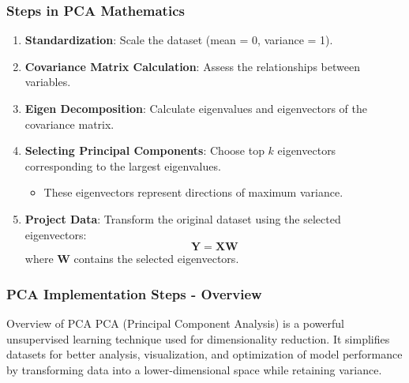 \documentclass[aspectratio=169]{beamer}
\begin{document}
\begin{frame}[fragile]
    \frametitle{Steps in PCA Mathematics}
    \begin{enumerate}
        \item \textbf{Standardization}: Scale the dataset (mean = 0, variance = 1).
        \item \textbf{Covariance Matrix Calculation}: Assess the relationships between variables.
        \item \textbf{Eigen Decomposition}: Calculate eigenvalues and eigenvectors of the covariance matrix.
        \item \textbf{Selecting Principal Components}: Choose top \( k \) eigenvectors corresponding to the largest eigenvalues.
            \begin{itemize}
                \item These eigenvectors represent directions of maximum variance.
            \end{itemize}
        \item \textbf{Project Data}: Transform the original dataset using the selected eigenvectors:
        \begin{equation}
            \mathbf{Y} = \mathbf{X} \mathbf{W}
        \end{equation}
        where \( \mathbf{W} \) contains the selected eigenvectors.
    \end{enumerate}
\end{frame}

\begin{frame}[fragile]
    \frametitle{PCA Implementation Steps - Overview}
    \begin{block}{Overview of PCA}
        PCA (Principal Component Analysis) is a powerful unsupervised learning technique used for dimensionality reduction. 
        It simplifies datasets for better analysis, visualization, and optimization of model performance by transforming data into a lower-dimensional space while retaining variance.
    \end{block}
\end{frame}
\end{document}
